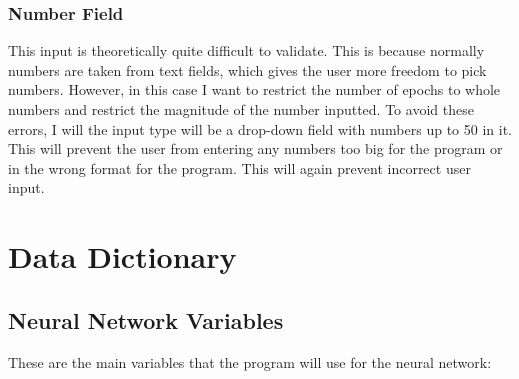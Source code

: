 \documentclass{report}
\begin{document}
\subsubsection{Number Field}
This input is theoretically quite difficult to validate. This is because normally numbers are taken from text fields, which gives the user more freedom to pick numbers. However, in this case I want to restrict the number of epochs to whole numbers and restrict the magnitude of the number inputted. To avoid these errors, I will the input type will be a drop-down field with numbers up to 50 in it. This will prevent the user from entering any numbers too big for the program or in the wrong format for the program. This will again prevent incorrect user input.
\newpage

\section{Data Dictionary}

\subsection{Neural Network Variables}
These are the main variables that the program will use for the neural network:
\end{document}
